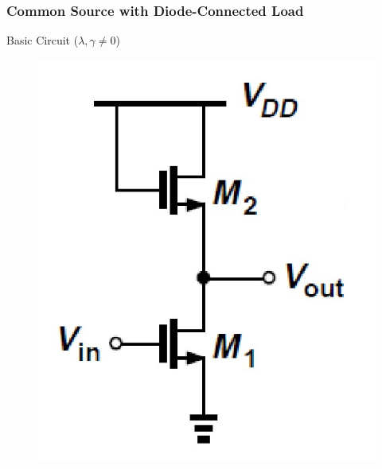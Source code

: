 \documentclass{beamer}
\begin{document}
\begin{frame}
    \frametitle{Common Source with Diode-Connected Load}
    \begin{minipage}{0.45\linewidth}
        Basic Circuit ($\lambda, \gamma\not= 0$)
        \begin{figure}[H]
            \centering
            \includegraphics[width=0.8\linewidth]{common-source-D}
        \end{figure}
         

\end{minipage}
\end{frame}
\end{document}
